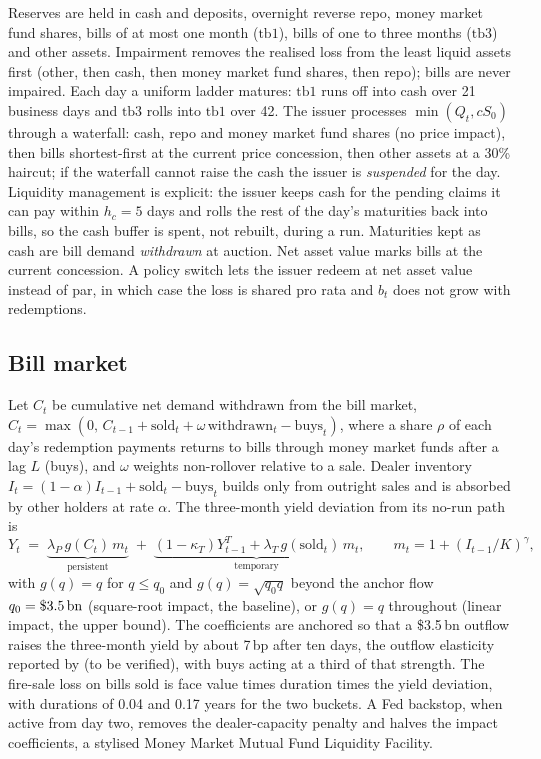Reserves are held in cash and deposits, overnight reverse repo, money market fund shares, bills of at most one
month ($\text{tb1}$), bills of one to three months ($\text{tb3}$) and other assets. Impairment removes the realised
loss from the least liquid assets first (other, then cash, then money market fund shares, then repo); bills are never
impaired. Each day a uniform ladder matures: $\text{tb1}$ runs off into cash over 21 business days and $\text{tb3}$
rolls into $\text{tb1}$ over 42. The issuer processes $\min(Q_t, cS_0)$ through a waterfall: cash, repo and money
market fund shares (no price impact), then bills shortest-first at the current price concession, then other assets
at a 30\% haircut; if the waterfall cannot raise the cash the issuer is \emph{suspended} for the day. Liquidity
management is explicit: the issuer keeps cash for the pending claims it can pay within $h_c=5$ days and rolls the
rest of the day's maturities back into bills, so the cash buffer is spent, not rebuilt, during a run. Maturities
kept as cash are bill demand \emph{withdrawn} at auction. Net asset value marks bills at the current concession.
A policy switch lets the issuer redeem at net asset value instead of par, in which case the loss is shared pro
rata and $b_t$ does not grow with redemptions.

\subsection{Bill market}

Let $C_t$ be cumulative net demand withdrawn from the bill market, $C_t = \max(0,\, C_{t-1} + \text{sold}_t +
\omega\,\text{withdrawn}_t - \text{buys}_t)$, where a share $\rho$ of each day's redemption payments returns to
bills through money market funds after a lag $L$ (buys), and $\omega$ weights non-rollover relative to a sale.
Dealer inventory $I_t = (1-\alpha) I_{t-1} + \text{sold}_t - \text{buys}_t$ builds only from outright sales and is
absorbed by other holders at rate $\alpha$. The three-month yield deviation from its no-run path is
\begin{equation}
Y_t \;=\; \underbrace{\lambda_P\, g(C_t)\, m_t}_{\text{persistent}} \;+\; \underbrace{(1-\kappa_T) Y^T_{t-1} +
\lambda_T\, g(\text{sold}_t)\, m_t}_{\text{temporary}}, \qquad m_t = 1 + (I_{t-1}/K)^{\gamma},
\label{eq:impact}
\end{equation}
with $g(q)=q$ for $q\le q_0$ and $g(q)=\sqrt{q_0 q}$ beyond the anchor flow $q_0=\$3.5\,\textrm{bn}$ (square-root impact,
the baseline), or $g(q)=q$ throughout (linear impact, the upper bound). The coefficients are anchored so that a
\$3.5\,bn outflow raises the three-month yield by about 7\,bp after ten days, the outflow elasticity reported by
\citet{ahmed2025} (to be verified), with buys acting at a third of that strength. The fire-sale loss on bills sold is
face value times duration times the yield deviation, with durations of 0.04 and 0.17 years for the two buckets. A
Fed backstop, when active from day two, removes the dealer-capacity penalty and halves the impact coefficients, a
stylised Money Market Mutual Fund Liquidity Facility.

